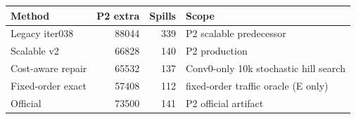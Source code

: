 \begin{tabular}{lrrl}
\toprule
Method & P2 extra & Spills & Scope \\
\midrule
Legacy iter038 & 88044 & 339 & P2 scalable predecessor \\
Scalable v2 & 66828 & 140 & P2 production \\
Cost-aware repair & 65532 & 137 & Conv0-only 10k stochastic hill search \\
Fixed-order exact & 57408 & 112 & fixed-order traffic oracle (E only) \\
Official & 73500 & 141 & P2 official artifact \\
\bottomrule
\end{tabular}

